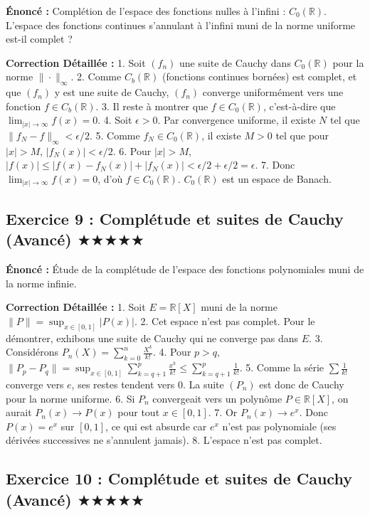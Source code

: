 \documentclass[11pt,a4paper]{article}
\begin{document}
\textbf{Énoncé :}
Complétion de l'espace des fonctions nulles à l'infini : $C_0(\mathbb{R})$. L'espace des fonctions continues s'annulant à l'infini muni de la norme uniforme est-il complet ?

\textbf{Correction Détaillée :}
1. Soit $(f_n)$ une suite de Cauchy dans $C_0(\mathbb{R})$ pour la norme $\|\cdot\|_\infty$.
2. Comme $C_b(\mathbb{R})$ (fonctions continues bornées) est complet, et que $(f_n)$ y est une suite de Cauchy, $(f_n)$ converge uniformément vers une fonction $f \in C_b(\mathbb{R})$.
3. Il reste à montrer que $f \in C_0(\mathbb{R})$, c'est-à-dire que $\lim_{|x| \to \infty} f(x) = 0$.
4. Soit $\epsilon > 0$. Par convergence uniforme, il existe $N$ tel que $\|f_N - f\|_\infty < \epsilon/2$.
5. Comme $f_N \in C_0(\mathbb{R})$, il existe $M > 0$ tel que pour $|x| > M$, $|f_N(x)| < \epsilon/2$.
6. Pour $|x| > M$, $|f(x)| \leq |f(x) - f_N(x)| + |f_N(x)| < \epsilon/2 + \epsilon/2 = \epsilon$.
7. Donc $\lim_{|x| \to \infty} f(x) = 0$, d'où $f \in C_0(\mathbb{R})$. $C_0(\mathbb{R})$ est un espace de Banach.


\subsection*{Exercice 9 : Complétude et suites de Cauchy (Avancé) \quad $\bigstar\bigstar\bigstar\bigstar\bigstar$}

\textbf{Énoncé :}
Étude de la complétude de l'espace des fonctions polynomiales muni de la norme infinie.

\textbf{Correction Détaillée :}
1. Soit $E = \mathbb{R}[X]$ muni de la norme $\|P\| = \sup_{x \in [0,1]} |P(x)|$.
2. Cet espace n'est pas complet. Pour le démontrer, exhibons une suite de Cauchy qui ne converge pas dans $E$.
3. Considérons $P_n(X) = \sum_{k=0}^n \frac{X^k}{k!}$.
4. Pour $p > q$, $\|P_p - P_q\| = \sup_{x \in [0,1]} \sum_{k=q+1}^p \frac{x^k}{k!} \leq \sum_{k=q+1}^p \frac{1}{k!}$.
5. Comme la série $\sum \frac{1}{k!}$ converge vers $e$, ses restes tendent vers 0. La suite $(P_n)$ est donc de Cauchy pour la norme uniforme.
6. Si $P_n$ convergeait vers un polynôme $P \in \mathbb{R}[X]$, on aurait $P_n(x) \to P(x)$ pour tout $x \in [0,1]$.
7. Or $P_n(x) \to e^x$. Donc $P(x) = e^x$ sur $[0,1]$, ce qui est absurde car $e^x$ n'est pas polynomiale (ses dérivées successives ne s'annulent jamais).
8. L'espace n'est pas complet.


\subsection*{Exercice 10 : Complétude et suites de Cauchy (Avancé) \quad $\bigstar\bigstar\bigstar\bigstar\bigstar$}
\end{document}
